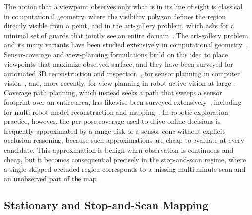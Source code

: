 \documentclass[sensors,article,submit,pdftex,moreauthors]{Definitions/mdpi}
\begin{document}
The notion that a viewpoint observes only what is in its line of sight is
classical in computational geometry, where the visibility polygon defines the
region directly visible from a point, and in the art-gallery problem, which asks
for a minimal set of guards that jointly see an entire
domain~\cite{gonzalez2002}. The art-gallery problem and its many
variants have been studied extensively in computational
geometry~\cite{orourke1987,urrutia2000}. Sensor-coverage and view-planning
formulations build on this idea to place viewpoints that maximize observed
surface, and they have been surveyed for automated 3D reconstruction and
inspection~\cite{scott2003}, for sensor planning in computer
vision~\cite{tarabanis1995}, and, more recently, for view planning in robot
active vision at large~\cite{zeng2020}. Coverage path planning, which instead seeks a path
that sweeps a sensor footprint over an entire area, has likewise been surveyed
extensively~\cite{choset2001,galceran2013}, including for multi-robot model
reconstruction and mapping~\cite{almadhoun2019}. In robotic exploration
practice, however, the per-pose coverage used to drive online decisions is
frequently approximated by a range disk or a sensor cone without explicit
occlusion reasoning, because such approximations are cheap to evaluate at every
candidate. This approximation is
benign when observation is continuous and cheap, but it becomes consequential
precisely in the stop-and-scan regime, where a single skipped occluded region
corresponds to a missing multi-minute scan and an unobserved part of the map.

\subsection{Stationary and Stop-and-Scan Mapping}
\end{document}
